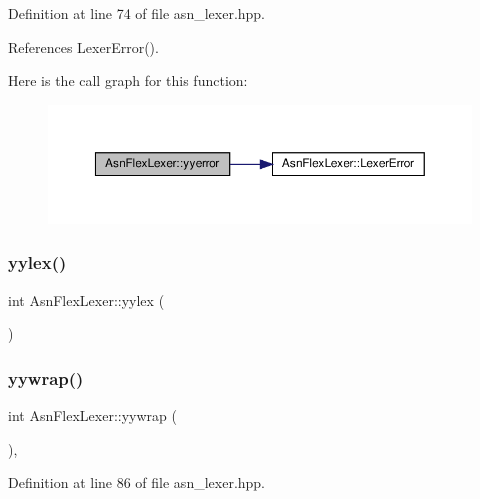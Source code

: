 Definition at line 74 of file asn\+\_\+lexer.\+hpp.



References Lexer\+Error().

Here is the call graph for this function\+:
\nopagebreak
\begin{figure}[H]
\begin{center}
\leavevmode
\includegraphics[width=350pt]{d9/d6b/classAsnFlexLexer_a0aedafd7d67e36bee5e6867f3950d8f6_cgraph}
\end{center}
\end{figure}
\mbox{\label{classAsnFlexLexer_a6d8a97df31d08813ceddfec7e841caab}} 
\subsubsection{\texorpdfstring{yylex()}{yylex()}}
{\footnotesize\ttfamily int Asn\+Flex\+Lexer\+::yylex (\begin{DoxyParamCaption}{ }\end{DoxyParamCaption})\hspace{0.3cm}{\ttfamily [override]}}

\mbox{\label{classAsnFlexLexer_afbd2259d58a1693fa2cfb13e6d9b6c3d}} 
\subsubsection{\texorpdfstring{yywrap()}{yywrap()}}
{\footnotesize\ttfamily int Asn\+Flex\+Lexer\+::yywrap (\begin{DoxyParamCaption}{ }\end{DoxyParamCaption})\hspace{0.3cm}{\ttfamily [inline]}, {\ttfamily [override]}}



Definition at line 86 of file asn\+\_\+lexer.\+hpp.



